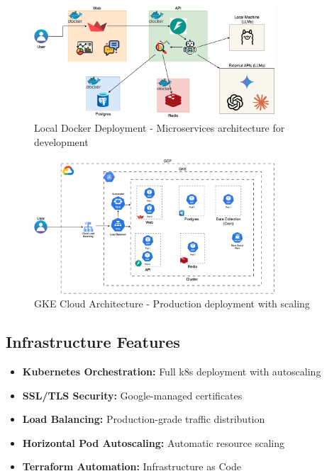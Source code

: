 \documentclass[11pt,a4paper]{article}
\begin{document}
\begin{figure}[h!]
\centering
\includegraphics[width=0.8\textwidth]{local-docker-deployment.png}
\caption{Local Docker Deployment - Microservices architecture for development}
\label{fig:docker}
\end{figure}

\begin{figure}[h!]
\centering
\includegraphics[width=0.8\textwidth]{gke-cloud-architecture.png}
\caption{GKE Cloud Architecture - Production deployment with scaling}
\label{fig:gke}
\end{figure}

\subsection{Infrastructure Features}
\begin{itemize}[itemsep=0.3em]
    \item \textbf{Kubernetes Orchestration:} Full k8s deployment with autoscaling
    \item \textbf{SSL/TLS Security:} Google-managed certificates
    \item \textbf{Load Balancing:} Production-grade traffic distribution
    \item \textbf{Horizontal Pod Autoscaling:} Automatic resource scaling
    \item \textbf{Terraform Automation:} Infrastructure as Code
\end{itemize}
\end{document}
